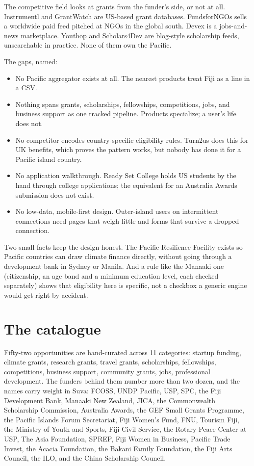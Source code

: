 \documentclass[11pt]{article}
\begin{document}
The competitive field looks at grants from the funder's side, or not at all. Instrumentl and GrantWatch are US-based grant databases. FundsforNGOs sells a worldwide paid feed pitched at NGOs in the global south. Devex is a jobs-and-news marketplace. Youthop and Scholars4Dev are blog-style scholarship feeds, unsearchable in practice. None of them own the Pacific.

The gaps, named:

\begin{itemize}
\item No Pacific aggregator exists at all. The nearest products treat Fiji as a line in a CSV.
\item Nothing spans grants, scholarships, fellowships, competitions, jobs, and business support as one tracked pipeline. Products specialize; a user's life does not.
\item No competitor encodes country-specific eligibility rules. Turn2us does this for UK benefits, which proves the pattern works, but nobody has done it for a Pacific island country.
\item No application walkthrough. Ready Set College holds US students by the hand through college applications; the equivalent for an Australia Awards submission does not exist.
\item No low-data, mobile-first design. Outer-island users on intermittent connections need pages that weigh little and forms that survive a dropped connection.
\end{itemize}

Two small facts keep the design honest. The Pacific Resilience Facility exists so Pacific countries can draw climate finance directly, without going through a development bank in Sydney or Manila. And a rule like the Manaaki one (citizenship, an age band and a minimum education level, each checked separately) shows that eligibility here is specific, not a checkbox a generic engine would get right by accident.

\section{The catalogue}

Fifty-two opportunities are hand-curated across 11 categories: startup funding, climate grants, research grants, travel grants, scholarships, fellowships, competitions, business support, community grants, jobs, professional development. The funders behind them number more than two dozen, and the names carry weight in Suva: FCOSS, UNDP Pacific, USP, SPC, the Fiji Development Bank, Manaaki New Zealand, JICA, the Commonwealth Scholarship Commission, Australia Awards, the GEF Small Grants Programme, the Pacific Islands Forum Secretariat, Fiji Women's Fund, FNU, Tourism Fiji, the Ministry of Youth and Sports, Fiji Civil Service, the Rotary Peace Center at USP, The Asia Foundation, SPREP, Fiji Women in Business, Pacific Trade Invest, the Acacia Foundation, the Bakani Family Foundation, the Fiji Arts Council, the ILO, and the China Scholarship Council.
\end{document}
